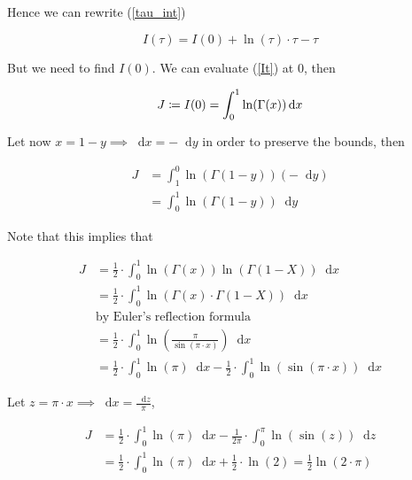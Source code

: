 \documentclass{article}
\newcommand*\diff{\mathop{}\!\mathrm{d}}
\begin{document}
Hence we can rewrite (\ref{tau_int})

\begin{equation}
    I(\tau) = I(0) + \ln(\tau) \cdot \tau - \tau
\end{equation}

But we need to find $I(0)$. We can evaluate (\ref{It}) at 0, then

\begin{equation}
    J \coloneqq I(0) = \int^1_0 \ln(\Gamma(x)) \diff x \\
\end{equation}

Let now $x= 1-y \implies \diff x = -\diff y$ in order to preserve the bounds, then

\begin{equation}
    \begin{split}
        J &= \int^0_1 \ln(\Gamma(1 - y)) (-\diff y) \\
        &=\int^1_0\ln(\Gamma(1 - y)) \diff y
    \end{split}
\end{equation}

Note that this implies that

\begin{equation}
    \begin{split}
        J &= \frac{1}{2} \cdot \int^1_0 \ln(\Gamma(x)) \ln(\Gamma(1 - X)) \diff x \\
        &= \frac{1}{2} \cdot \int^1_0 \ln(\Gamma(x) \cdot \Gamma(1 - X)) \diff x\\
        &\text{by Euler's reflection formula}\\
        &= \frac{1}{2} \cdot \int^1_0 \ln\left( \frac{\pi}{\sin{(\pi \cdot x)}} \right) \diff x \\
        &= \frac{1}{2} \cdot \int^1_0 \ln(\pi) \diff x - \frac{1}{2} \cdot \int^1_0 \ln(\sin{(\pi \cdot x)}) \diff x 
    \end{split}
\end{equation}

Let $z = \pi \cdot x \implies \diff x = \frac{\diff z}{\pi}$,

\begin{equation}
    \begin{split}
        J &= \frac{1}{2} \cdot \int^1_0 \ln(\pi) \diff x - \frac{1}{2 \pi} \cdot \int^\pi_0 \ln(\sin{(z)}) \diff z \\
        &= \frac{1}{2} \cdot \int^1_0 \ln(\pi) \diff x + \frac{1}{2} \cdot \ln(2) = \frac{1}{2} \ln(2 \cdot \pi)
    \end{split}
\end{equation}
\end{document}
